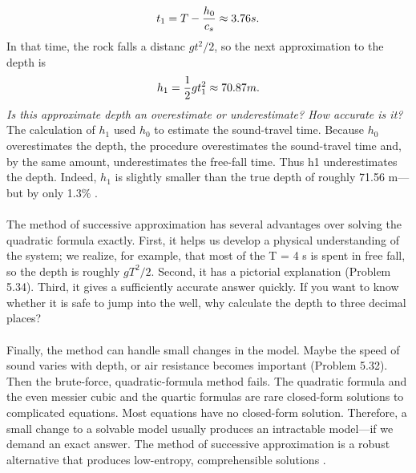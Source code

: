 \documentclass[fleqn]{book}
\newcounter{pro1}
\begin{document}
 
\pagestyle{fancy} 

\renewcommand{\headrulewidth}{0pt}
\fancyhf{} %

\begin{equation} 
\Large t_{1}=T-\frac{h_{0}}{c_{s}}\approx 3.76s.
\end{equation} 
\Large \textrm{In that time, the rock falls a distanc $gt^{2}/2$, so the next approximation to the depth is} 
\begin{equation}
\Large h_{1}=\frac{1}{2}gt_{1}^{2}\approx 70.87m.
\end{equation} 
 \large\textsl{Is this approximate depth an overestimate or underestimate? How accurate is it?} \\ 
\Large \textrm{The calculation of $h_{1}$ used $h_{0}$ to estimate the sound-travel time. Because 
$h_{0}$ overestimates the depth, the procedure overestimates the sound-travel 
time and, by the same amount, underestimates the free-fall time. Thus 
h1 underestimates the depth. Indeed, $h_{1}$ is slightly smaller than the true 
depth of roughly 71.56 m—but by only 1.3\% .} \\ 
\\
\Large\textrm{The method of successive approximation has several advantages over solving the quadratic formula exactly. First, it helps us develop a physical 
understanding of the system; we realize, for example, that most of the 
T = 4 s is spent in free fall, so the depth is roughly $gT^{2}/2$. Second, it 
has a pictorial explanation (Problem 5.34). Third, it gives a sufficiently 
accurate answer quickly. If you want to know whether it is safe to jump 
into the well, why calculate the depth to three decimal places?} \\ 
\\
\Large\textrm{Finally, the method can handle small changes in the model. Maybe the 
speed of sound varies with depth, or air resistance becomes important 
(Problem 5.32). Then the brute-force, quadratic-formula method fails. The 
quadratic formula and the even messier cubic and the quartic formulas 
are rare closed-form solutions to complicated equations. Most equations 
have no closed-form solution. Therefore, a small change to a solvable 
model usually produces an intractable model—if we demand an exact 
answer. The method of successive approximation is a robust alternative 
that produces low-entropy, comprehensible solutions .} \\ 
\end{document}
